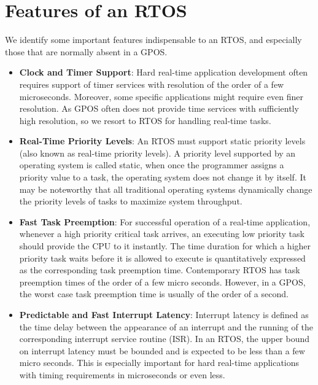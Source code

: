 \documentclass[12pt]{report}
\begin{document}
\section{Features of an RTOS}
We identify some important features indispensable to an RTOS, and especially those that are normally absent in a GPOS. 
\begin{itemize}
    \item \textbf{Clock and Timer Support}: Hard real-time application development often requires support of timer services with resolution of the order of a few microseconds. Moreover, some specific applications might require even finer resolution. As GPOS often does not provide time services with sufficiently high resolution, so we resort to RTOS for handling real-time tasks. 
    \item \textbf{Real-Time Priority Levels}: An RTOS must support static priority levels (also known as real-time priority levels). A priority level supported by an operating system is called static, when once the programmer assigns a priority value to a task, the operating system does not change it by itself. It may be noteworthy that all traditional operating systems dynamically change the priority levels of tasks to maximize system throughput. 
    \item \textbf{Fast Task Preemption}: For successful operation of a real-time application, whenever a high priority critical task arrives, an executing low priority task should provide the CPU to it instantly. The time duration for which a higher priority task waits before it is allowed to execute is quantitatively expressed as the corresponding task preemption time. Contemporary RTOS has task preemption times of the order of a few micro seconds. However, in a GPOS, the worst case task preemption time is usually of the order of a second. 
    \item \textbf{Predictable and Fast Interrupt Latency}: Interrupt latency is defined as the time delay between the appearance of an interrupt and the running of the corresponding interrupt service routine (ISR). In an RTOS, the upper bound on interrupt latency must be bounded and is expected to be less than a few micro seconds. This is especially important for hard real-time applications with timing requirements in microseconds or even less. 
\end{itemize}
\end{document}
